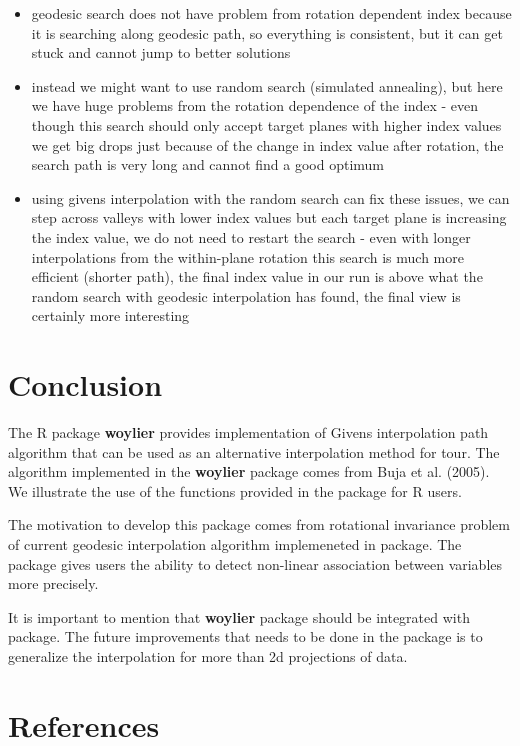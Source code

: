 \begin{itemize}
\tightlist
\item
  geodesic search does not have problem from rotation dependent index because it is searching along geodesic path, so everything is consistent, but it can get stuck and cannot jump to better solutions
\item
  instead we might want to use random search (simulated annealing), but here we have huge problems from the rotation dependence of the index - even though this search should only accept target planes with higher index values we get big drops just because of the change in index value after rotation, the search path is very long and cannot find a good optimum
\item
  using givens interpolation with the random search can fix these issues, we can step across valleys with lower index values but each target plane is increasing the index value, we do not need to restart the search - even with longer interpolations from the within-plane rotation this search is much more efficient (shorter path), the final index value in our run is above what the random search with geodesic interpolation has found, the final view is certainly more interesting
\end{itemize}

\hypertarget{conclusion}{%
\section{Conclusion}\label{conclusion}}

The R package \textbf{woylier} provides implementation of Givens interpolation path algorithm that can be used as an alternative interpolation method for tour. The algorithm implemented in the \textbf{woylier} package comes from Buja et al. (2005). We illustrate the use of the functions provided in the package for R users.

The motivation to develop this package comes from rotational invariance problem of current geodesic interpolation algorithm implemeneted in  package. The package gives users the ability to detect non-linear association between variables more precisely.

It is important to mention that \textbf{woylier} package should be integrated with  package. The future improvements that needs to be done in the package is to generalize the interpolation for more than 2d projections of data.

\hypertarget{references}{%
\section*{References}\label{references}}


